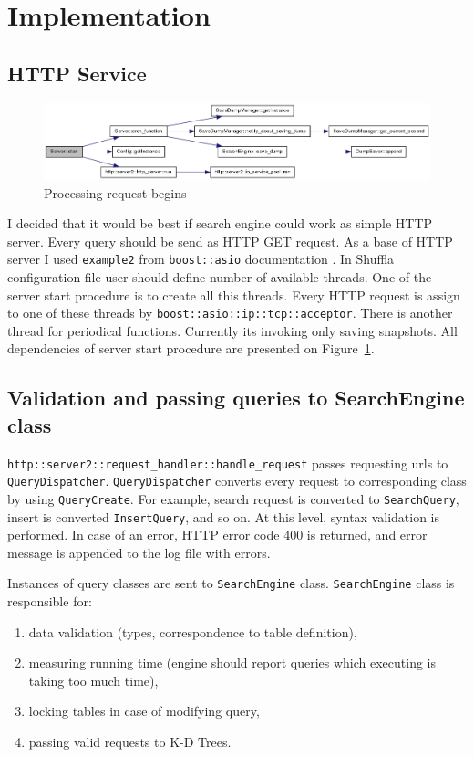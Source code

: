 \documentclass[10pt,a4paper]{article}
\begin{document}
\section{Implementation}

\subsection{HTTP Service}

\begin{figure}
\centering
  \includegraphics[width=16cm]{start}
  \caption{Processing request begins}
  \label{fig:httpservice}
\end{figure}

I decided that it would be best if search engine could work as simple HTTP server. Every query should be send as HTTP GET request. As a base of HTTP server I used \verb|example2| from \verb|boost::asio| documentation \cite{ASIOHTTP}. In Shuffla configuration file user should define number of available threads. One of the server start procedure is to create all this threads. Every HTTP request is assign to one of these threads by \verb|boost::asio::ip::tcp::acceptor|. There is another thread for periodical functions. Currently its invoking only saving snapshots. All dependencies of server start procedure are presented on Figure~\ref{fig:httpservice}.

\subsection{Validation and passing queries to SearchEngine class}

\verb|http::server2::request_handler::handle_request| passes requesting urls to \verb|QueryDispatcher|. \verb|QueryDispatcher| converts every request to corresponding class by using \verb|QueryCreate|. For example, search request is converted to \verb|SearchQuery|, insert is converted \verb|InsertQuery|, and so on. At this level, syntax validation is performed. In case of an error, HTTP error code 400 is returned, and error message is appended to the log file with errors. 

Instances of query classes are sent to \verb|SearchEngine| class. \verb|SearchEngine| class is responsible for:
\begin{enumerate}
\item data validation (types, correspondence to table definition),
\item measuring running time (engine should report queries which executing is taking too much time),
\item locking tables in case of modifying query,
\item passing valid requests to K-D Trees.
\end{enumerate}
\end{document}
